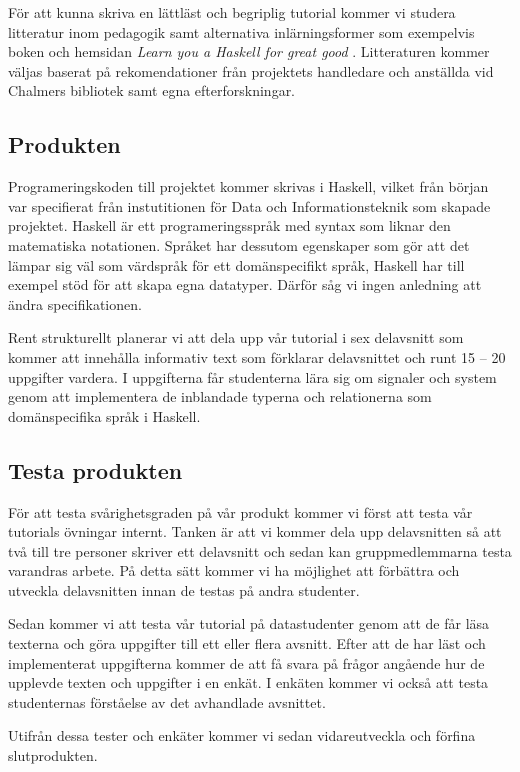 \documentclass{article}
\begin{document}
För att kunna skriva en lättläst och begriplig tutorial
kommer vi studera litteratur inom pedagogik samt
alternativa inlärningsformer som exempelvis boken och
hemsidan \textit{Learn you a Haskell for great good} \cite{learnyouahaskell}.
Litteraturen kommer väljas baserat på rekomendationer från
projektets handledare och anställda vid Chalmers bibliotek
samt egna efterforskningar.

\subsection{Produkten}
Programeringskoden till projektet kommer skrivas i Haskell,
vilket från början var specifierat från instutitionen för
Data och Informationsteknik som skapade projektet.
Haskell är ett programeringsspråk med syntax som liknar den
matematiska notationen. Språket har dessutom egenskaper
som gör att det lämpar sig väl som värdspråk för ett domänspecifikt språk,
Haskell har till exempel stöd för att skapa egna datatyper.
Därför såg vi ingen anledning att ändra specifikationen.

Rent strukturellt planerar vi att dela upp vår tutorial i
sex delavsnitt som kommer att innehålla informativ text som
förklarar delavsnittet och runt 15 -- 20 uppgifter vardera.
I uppgifterna får studenterna lära sig om signaler och
system genom att implementera de inblandade typerna
och relationerna som domänspecifika språk i Haskell.

\subsection{Testa produkten}
För att testa svårighetsgraden på vår produkt kommer vi
först att testa vår tutorials övningar internt. Tanken är att
vi kommer dela upp delavsnitten så att två till tre personer
skriver ett delavsnitt och sedan kan gruppmedlemmarna testa
varandras arbete. På detta sätt kommer vi ha möjlighet att
förbättra och utveckla delavsnitten innan de
testas på andra studenter.

Sedan kommer vi att testa vår tutorial på datastudenter genom
att de får läsa texterna och göra uppgifter till ett eller flera avsnitt.
Efter att de har läst och implementerat uppgifterna kommer de att få svara på
frågor angående hur de upplevde texten och uppgifter i en enkät.
I enkäten kommer vi också att testa studenternas förståelse av det avhandlade avsnittet.

Utifrån dessa tester och enkäter kommer vi sedan vidareutveckla och förfina slutprodukten.
\end{document}
